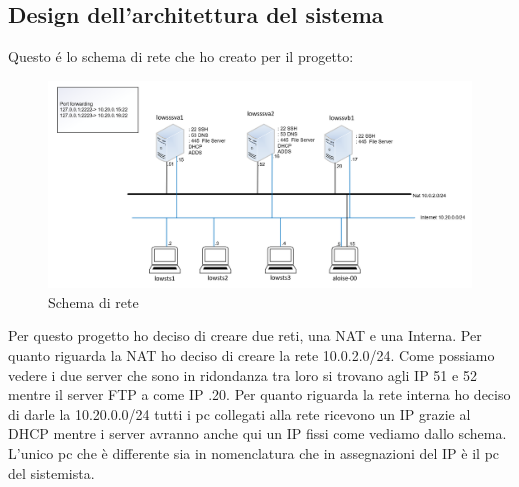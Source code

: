 \documentclass[../main.tex]{subfiles}
\begin{document}
\subsection{Design dell’architettura del sistema}
Questo é lo schema di rete che ho creato per il progetto:
 \begin{figure}[h]
    \centering
    \includegraphics[width=1\textwidth]{Images/schemaRete.PNG}
    \caption{Schema di rete}
\end{figure}

Per questo progetto ho deciso di creare due reti, una NAT e una Interna. Per quanto riguarda la NAT ho deciso di creare la rete 10.0.2.0/24.  Come possiamo vedere i due server che sono in ridondanza tra loro si trovano agli IP 51 e 52 mentre il server FTP a come IP .20. Per quanto riguarda la rete interna ho deciso di darle la 10.20.0.0/24 tutti i pc collegati alla rete ricevono un IP grazie al DHCP mentre i server avranno anche qui un IP fissi come vediamo dallo schema. L'unico pc che è differente sia in nomenclatura che in assegnazioni del IP è il pc del sistemista.
\end{document}
